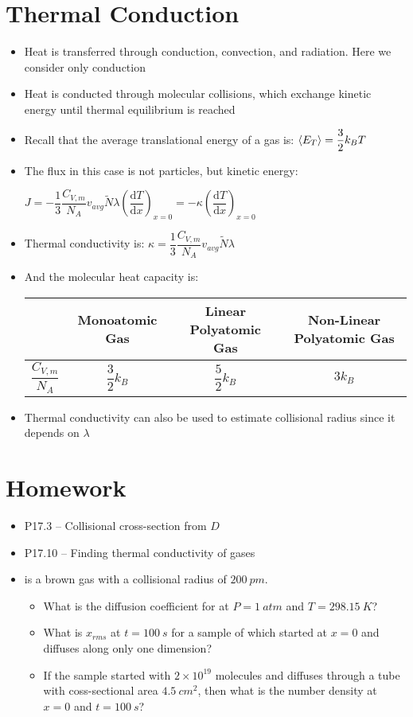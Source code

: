 \documentclass[12pt, openany, letterpaper]{memoir}
\begin{document}
\section*{Thermal Conduction}
\begin{itemize}
	\item Heat is transferred through conduction, convection, and radiation. Here we consider only conduction
	\item Heat is conducted through molecular collisions, which exchange kinetic energy until thermal equilibrium is reached
	\item Recall that the average translational energy of a gas is: $\left< E_T \right> = \dfrac{3}{2}k_BT$
	\item The flux in this case is not particles, but kinetic energy:
	
	$J = -\dfrac{1}{3}\dfrac{C_{V,m}}{N_A}v_{avg}\tilde{N}\lambda\left(\dfrac{\mathrm{d}T}{\mathrm{d}x}\right)_{x=0} = -\kappa \left(\dfrac{\mathrm{d}T}{\mathrm{d}x}\right)_{x=0}$
	
	\item Thermal conductivity is: $\kappa = \dfrac{1}{3}\dfrac{C_{V,m}}{N_A}v_{avg}\tilde{N}\lambda$
	\item And the molecular heat capacity is:
	
	\begin{tabular}{c|c|c|c}
		& Monoatomic Gas & Linear Polyatomic Gas & Non-Linear Polyatomic Gas\\ \midrule
		$\dfrac{C_{V,m}}{N_A}$ & $\dfrac{3}{2}k_B$ & $\dfrac{5}{2}k_B$ & $3k_B$
	\end{tabular}
	\item Thermal conductivity can also be used to estimate collisional radius since it depends on $\lambda$
\end{itemize}
\section*{Homework}
\begin{itemize}
	\item P17.3 -- Collisional cross-section from $D$
	\item P17.10 -- Finding thermal conductivity of gases
	\item {} is a brown gas with a collisional radius of $200~pm$. 
	\begin{itemize}
		\item What is the diffusion coefficient for  at $P=1~atm$ and $T=298.15~K$?
		\item What is $x_{rms}$ at $t=100~s$ for a sample of  which started at $x=0$ and diffuses along only one dimension?
		\item If the sample started with $2\times10^{19}$ molecules and diffuses through a tube with coss-sectional area $4.5~cm^2$, then what is the number density at $x=0$ and $t=100~s$?
	\end{itemize}
\end{itemize}
\end{document}

